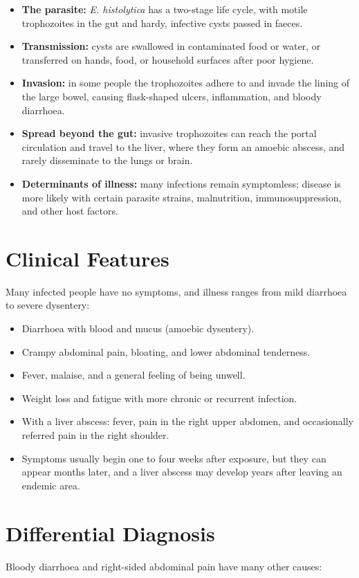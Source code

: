 \begin{itemize}
    \item \textbf{The parasite:} \textit{E. histolytica} has a two-stage life cycle, with motile trophozoites in the gut and hardy, infective cysts passed in faeces.
    \item \textbf{Transmission:} cysts are swallowed in contaminated food or water, or transferred on hands, food, or household surfaces after poor hygiene.
    \item \textbf{Invasion:} in some people the trophozoites adhere to and invade the lining of the large bowel, causing flask-shaped ulcers, inflammation, and bloody diarrhoea.
    \item \textbf{Spread beyond the gut:} invasive trophozoites can reach the portal circulation and travel to the liver, where they form an amoebic abscess, and rarely disseminate to the lungs or brain.
    \item \textbf{Determinants of illness:} many infections remain symptomless; disease is more likely with certain parasite strains, malnutrition, immunosuppression, and other host factors.
\end{itemize}

\section*{Clinical Features}
Many infected people have no symptoms, and illness ranges from mild diarrhoea to severe dysentery:

\begin{itemize}
    \item Diarrhoea with blood and mucus (amoebic dysentery).
    \item Crampy abdominal pain, bloating, and lower abdominal tenderness.
    \item Fever, malaise, and a general feeling of being unwell.
    \item Weight loss and fatigue with more chronic or recurrent infection.
    \item With a liver abscess: fever, pain in the right upper abdomen, and occasionally referred pain in the right shoulder.
    \item Symptoms usually begin one to four weeks after exposure, but they can appear months later, and a liver abscess may develop years after leaving an endemic area.
\end{itemize}

\section*{Differential Diagnosis}
Bloody diarrhoea and right-sided abdominal pain have many other causes:

